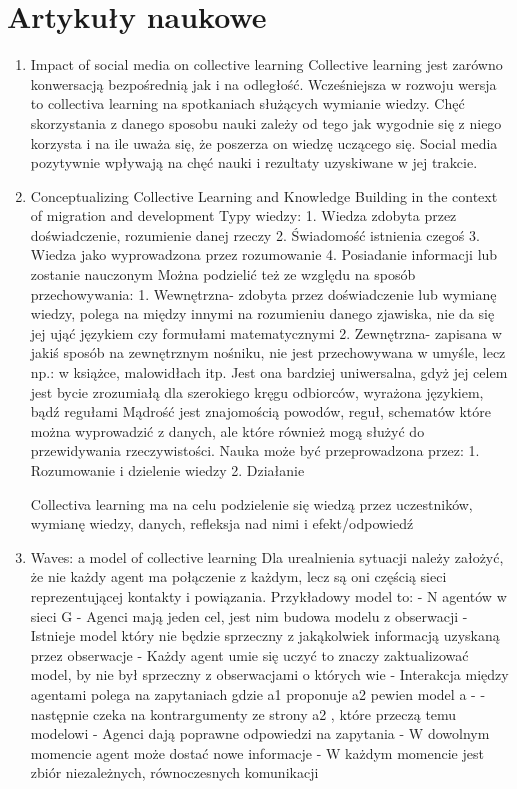 \documentclass[11pt]{aghdpl}
\begin{document}
\section{Artykuły naukowe}
\begin{enumerate}
\item Impact of social media on collective learning
Collective learning jest zarówno konwersacją bezpośrednią jak i na odległość.
Wcześniejsza w rozwoju wersja to collectiva learning na spotkaniach służących wymianie wiedzy. Chęć skorzystania z danego sposobu nauki zależy od tego jak wygodnie się z niego korzysta i na ile uważa się, że poszerza on wiedzę uczącego się.
Social media pozytywnie wpływają na chęć nauki i rezultaty uzyskiwane w jej trakcie.

\item Conceptualizing Collective Learning and Knowledge Building in the context of migration and development
Typy wiedzy:
1.	Wiedza zdobyta przez doświadczenie, rozumienie danej rzeczy
2.	Świadomość istnienia czegoś
3.	Wiedza jako wyprowadzona przez rozumowanie
4.	Posiadanie informacji lub zostanie nauczonym
Można podzielić też ze względu na sposób przechowywania:
1.	Wewnętrzna- zdobyta przez doświadczenie lub wymianę wiedzy, polega na między innymi na rozumieniu danego zjawiska, nie da się jej ująć językiem czy formułami matematycznymi
2.	Zewnętrzna- zapisana w jakiś sposób na zewnętrznym nośniku, nie jest przechowywana w umyśle, lecz np.: w książce, malowidłach itp. Jest ona bardziej uniwersalna, gdyż jej celem jest bycie zrozumiałą dla szerokiego kręgu odbiorców, wyrażona językiem, bądź regułami
Mądrość jest znajomością powodów, reguł, schematów które można wyprowadzić z danych, ale które również mogą służyć do przewidywania rzeczywistości.
Nauka może być przeprowadzona przez:
1.	Rozumowanie i dzielenie wiedzy
2.	Działanie

Collectiva learning ma na celu podzielenie się wiedzą przez uczestników, wymianę wiedzy, danych, refleksja nad nimi i efekt/odpowiedź

\item Waves: a model of collective learning
Dla urealnienia sytuacji należy założyć, że nie każdy agent ma połączenie z każdym, lecz są oni częścią sieci reprezentującej kontakty i powiązania.
Przykładowy model to:
- N agentów w sieci G
- Agenci mają jeden cel, jest nim budowa modelu z obserwacji
- Istnieje model który nie będzie sprzeczny z jakąkolwiek informacją uzyskaną przez obserwacje
- Każdy agent umie się uczyć to znaczy zaktualizować model, by nie był sprzeczny z obserwacjami o których wie
- Interakcja między agentami polega na zapytaniach gdzie a1 proponuje a2 pewien model a - -następnie czeka na kontrargumenty ze strony a2 , które przeczą temu modelowi
- Agenci dają poprawne odpowiedzi na zapytania
- W dowolnym momencie agent może dostać nowe informacje
- W każdym momencie jest zbiór niezależnych, równoczesnych komunikacji


\end{enumerate}
\end{document}
